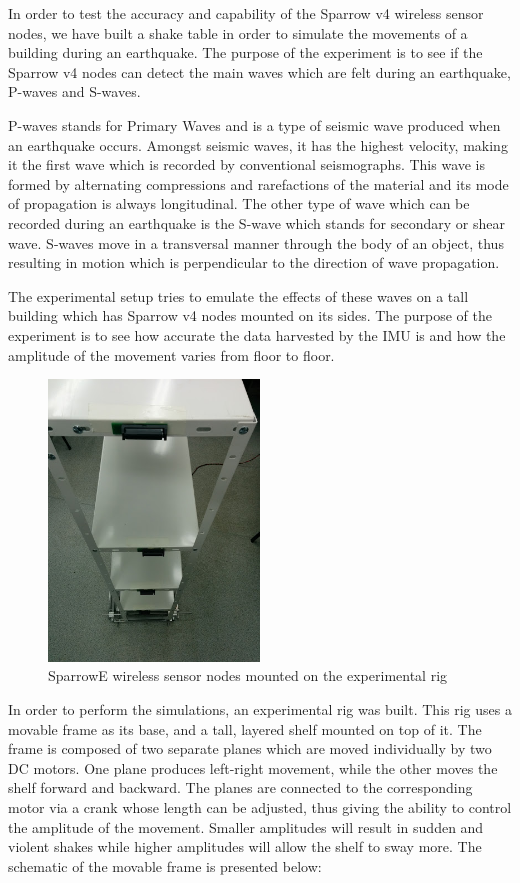 In order to test the accuracy and capability of the Sparrow v4 wireless sensor nodes, we 
have built a shake table in order to simulate the movements of a building during an earthquake.
The purpose of the experiment is to see if the Sparrow v4 nodes can detect the main waves which 
are felt during an earthquake, P-waves and S-waves.

P-waves stands for Primary Waves and is a type of seismic wave produced when an earthquake occurs.
Amongst seismic waves, it has the highest velocity, making it the first wave which is recorded by 
conventional seismographs. This wave is formed by alternating compressions and rarefactions of the 
material and its mode of propagation is always longitudinal. The other type of wave which can be 
recorded during an earthquake is the S-wave which stands for secondary or shear wave. S-waves move 
in a transversal manner through the body of an object, thus resulting in motion which is perpendicular 
to the direction of wave propagation. 

The experimental setup tries to emulate the effects of these waves on a tall building which has Sparrow v4 
nodes mounted on its sides. The purpose of the experiment is to see how accurate the data harvested by the 
IMU is and how the amplitude of the movement varies from floor to floor.

\begin{figure}[ht] \centering
  \includegraphics[width=0.5\textwidth]{img/mounted-sparrow-nodes.jpg}
  \caption{SparrowE wireless sensor nodes mounted on the experimental rig}
\end{figure}

In order to perform the simulations, an experimental rig was built. This rig uses a movable frame as its base, 
and a tall, layered shelf mounted on top of it. The frame is composed of two separate planes which are moved 
individually by two DC motors. One plane produces left-right movement, while the other moves the shelf forward and 
backward. The planes are connected to the corresponding motor via a crank whose length can be adjusted, thus giving the 
ability to control the amplitude of the movement. Smaller amplitudes will result in sudden and violent shakes while 
higher amplitudes will allow the shelf to sway more. The schematic of the movable frame is presented below:

